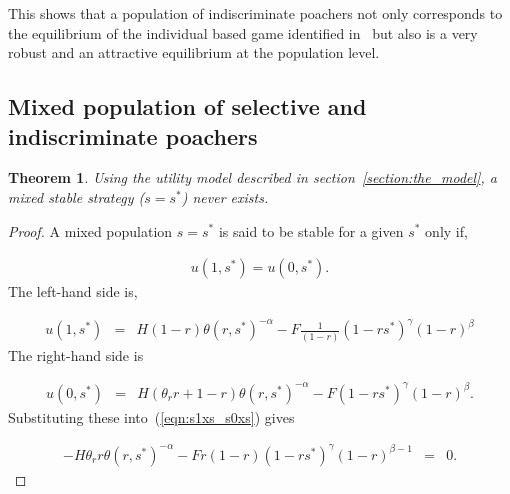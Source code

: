 \documentclass[10pt]{article}
\newtheorem{theorem}{Theorem}
\begin{document}
This shows that a population of indiscriminate poachers 
not only corresponds to the equilibrium of the individual based 
game identified in~\cite{Lee} but also is a very robust and an attractive 
equilibrium at the population level.

\subsection{Mixed population of selective and indiscriminate poachers}

\begin{theorem} 
Using the utility model described in section~\ref{section:the_model}, a mixed
stable strategy (\(s=s^*\)) never exists.  
\end{theorem}

\begin{proof}
    A mixed population \(s = s^*\) is said to be stable for a
    given \(s^*\) only if,

    \begin{eqnarray}
    \label{eqn:s1xs_s0xs}
    u(1,s^*) = u(0,s^*).
    \end{eqnarray}
    The left-hand side is,

    \begin{eqnarray} \nonumber
    u(1,s^*)&=&
    H(1 - r) \theta(r, s^*)^{-\alpha} - F \frac{1}{(1 - r)}(1 - rs^*)^{\gamma}(1 - r)^{\beta} 
    \end{eqnarray}
    The right-hand side is

    \begin{eqnarray} \nonumber
    u(0,s^*)&=&
    H(\theta_rr + 1 - r)\theta(r, s^*)^{-\alpha} - F(1 - rs^*)^{\gamma}(1 - r)^{\beta} .      
    \end{eqnarray}
    Substituting these into~(\ref{eqn:s1xs_s0xs}) gives

    \begin{eqnarray}
    \label{eqn:stablemixed}
            - H \theta_r r \theta(r, s^*)^{-\alpha}  - F  r{(1 - r)} (1 - rs^*)^{\gamma}(1 - r)^{\beta - 1}&=& 0.
            \end{eqnarray}


\end{proof}
\end{document}
